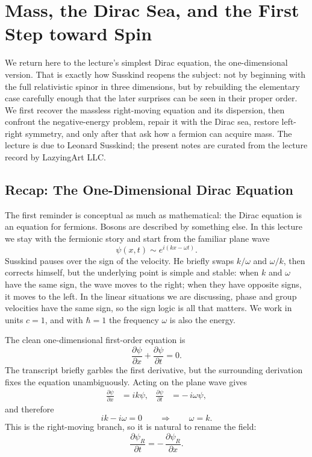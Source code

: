 \chapter{Mass, the Dirac Sea, and the First Step toward Spin}

We return here to the lecture's simplest Dirac equation, the one-dimensional version. That is exactly how Susskind reopens the subject: not by beginning with the full relativistic spinor in three dimensions, but by rebuilding the elementary case carefully enough that the later surprises can be seen in their proper order. We first recover the massless right-moving equation and its dispersion, then confront the negative-energy problem, repair it with the Dirac sea, restore left-right symmetry, and only after that ask how a fermion can acquire mass. The lecture is due to Leonard Susskind; the present notes are curated from the lecture record by LazyingArt LLC.

\section{Recap: The One-Dimensional Dirac Equation}

The first reminder is conceptual as much as mathematical: the Dirac equation is an equation for fermions. Bosons are described by something else. In this lecture we stay with the fermionic story and start from the familiar plane wave
\begin{equation}
\psi(x,t)\sim e^{i(kx-\omega t)}.
\end{equation}
Susskind pauses over the sign of the velocity. He briefly swaps \(k/\omega\) and \(\omega/k\), then corrects himself, but the underlying point is simple and stable: when \(k\) and \(\omega\) have the same sign, the wave moves to the right; when they have opposite signs, it moves to the left. In the linear situations we are discussing, phase and group velocities have the same sign, so the sign logic is all that matters. We work in units \(c=1\), and with \(\hbar=1\) the frequency \(\omega\) is also the energy.

The clean one-dimensional first-order equation is
\begin{equation}
\frac{\partial \psi}{\partial x}+\frac{\partial \psi}{\partial t}=0.
\end{equation}
The transcript briefly garbles the first derivative, but the surrounding derivation fixes the equation unambiguously. Acting on the plane wave gives
\begin{align}
\frac{\partial \psi}{\partial x}&=ik\psi, &
\frac{\partial \psi}{\partial t}&=-\,i\omega\psi,
\end{align}
and therefore
\begin{equation}
ik-i\omega=0
\qquad \Longrightarrow \qquad
\omega=k.
\end{equation}
This is the right-moving branch, so it is natural to rename the field:
\begin{equation}
\frac{\partial \psi_R}{\partial t}=-\,\frac{\partial \psi_R}{\partial x}.
\end{equation}

